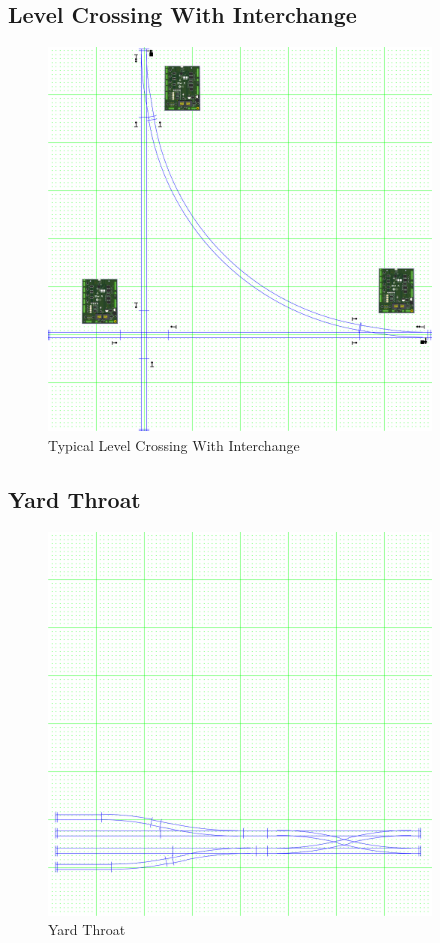 \subsection{Level Crossing With Interchange}
\begin{figure}[hbpt]\begin{centering}%
\includegraphics[width=4in]{ESP32S3-LevelCrossingWInterchange.png}
\caption{Typical Level Crossing With Interchange}
\label{fig:LevelCrossingWInterchange}
\end{centering}\end{figure}

\subsection{Yard Throat}
\begin{figure}[hbpt]\begin{centering}%
\includegraphics[width=4in]{ESP32S3-YardThroat.png}
\caption{Yard Throat}
\label{fig:YardThroat}
\end{centering}\end{figure}
